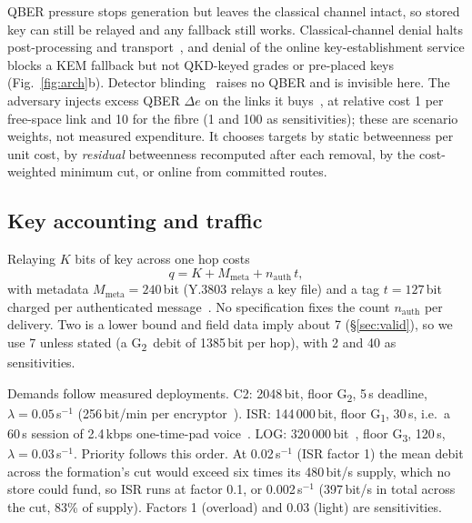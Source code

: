 \documentclass[conference,a4paper]{IEEEtran}
\newcommand{\GI}{G\textsubscript{1}}
\newcommand{\GII}{G\textsubscript{2}}
\newcommand{\GIII}{G\textsubscript{3}}
\begin{document}
QBER pressure stops generation but leaves the classical channel intact, so stored key
can still be relayed and any fallback still works. Classical-channel denial halts
post-processing and transport~\cite{mehic}, and denial of the online key-establishment
service blocks a KEM fallback but not QKD-keyed grades or pre-placed keys
(Fig.~\ref{fig:arch}b). Detector blinding~\cite{lydersen} raises no QBER and is
invisible here. The adversary injects excess QBER $\Delta e$ on the links it
buys~\cite{schartner}, at relative cost 1 per free-space link and 10 for the fibre (1
and 100 as sensitivities); these are scenario weights, not measured expenditure. It chooses targets by static betweenness per unit cost, by \emph{residual} betweenness
recomputed after each removal, by the cost-weighted minimum cut, or online from
committed routes.

\subsection{Key accounting and traffic}\label{sec:acct}
Relaying $K$ bits of key across one hop costs
\begin{equation}\label{eq:debit}
q=K+M_{\mathrm{meta}}+n_{\mathrm{auth}}\,t,
\end{equation}
with metadata $M_{\mathrm{meta}}=240$\,bit (Y.3803 relays a key file) and a tag
$t=127$\,bit~\cite{walenta} charged per authenticated message~\cite{fung}. No
specification fixes the count $n_{\mathrm{auth}}$ per delivery. Two is a lower bound
and field data imply about 7 (\S\ref{sec:valid}), so we use 7 unless stated (a \GII\
debit of 1385\,bit per hop), with 2 and 40 as sensitivities.

Demands follow measured deployments. C2: 2048\,bit, floor \GII, 5\,s deadline,
$\lambda=0.05$\,s$^{-1}$ (256\,bit/min per encryptor~\cite{stucki}). ISR:
144\,000\,bit, floor \GI, 30\,s, i.e.\ a 60\,s session of 2.4\,kbps one-time-pad
voice~\cite{chen}. LOG: 320\,000\,bit~\cite{chen}, floor \GIII, 120\,s,
$\lambda=0.03$\,s$^{-1}$. Priority follows this order. At 0.02\,s$^{-1}$ (ISR factor
1) the mean debit across the formation's cut would exceed six times its 480\,bit/s
supply, which no store could fund, so ISR runs at factor 0.1, or 0.002\,s$^{-1}$
(397\,bit/s in total across the cut, 83\% of supply). Factors 1 (overload) and 0.03
(light) are sensitivities.
\end{document}
